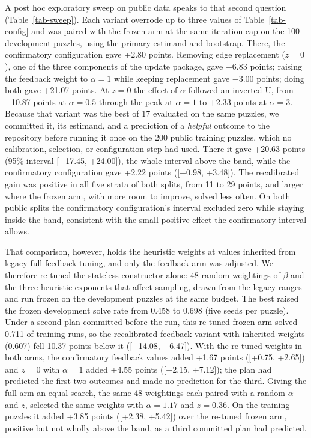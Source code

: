 \documentclass[pdflatex,sn-basic,iicol]{sn-jnl}
\begin{document}
A post hoc exploratory sweep on public data speaks to that second question (Table~\ref{tab-sweep}). Each variant overrode up to three values of Table~\ref{tab-config} and was paired with the frozen arm at the same iteration cap on the 100 development puzzles, using the primary estimand and bootstrap. There, the confirmatory configuration gave +2.80 points. Removing edge replacement ($z = 0$), one of the three components of the update package, gave +6.83 points; raising the feedback weight to $\alpha = 1$ while keeping replacement gave \(-\)3.00 points; doing both gave +21.07 points. At $z = 0$ the effect of $\alpha$ followed an inverted U, from +10.87 points at $\alpha = 0.5$ through the peak at $\alpha = 1$ to +2.33 points at $\alpha = 3$. Because that variant was the best of 17 evaluated on the same puzzles, we committed it, its estimand, and a prediction of a \emph{helpful} outcome to the repository before running it once on the 200 public training puzzles, which no calibration, selection, or configuration step had used. There it gave +20.63 points (95\% interval [+17.45, +24.00]), the whole interval above the band, while the confirmatory configuration gave +2.22 points ([+0.98, +3.48]). The recalibrated gain was positive in all five strata of both splits, from 11 to 29 points, and larger where the frozen arm, with more room to improve, solved less often. On both public splits the confirmatory configuration's interval excluded zero while staying inside the band, consistent with the small positive effect the confirmatory interval allows.

That comparison, however, holds the heuristic weights at values inherited from legacy full-feedback tuning, and only the feedback arm was adjusted. We therefore re-tuned the stateless constructor alone: 48 random weightings of $\beta$ and the three heuristic exponents that affect sampling, drawn from the legacy ranges and run frozen on the development puzzles at the same budget. The best raised the frozen development solve rate from 0.458 to 0.698 (five seeds per puzzle). Under a second plan committed before the run, this re-tuned frozen arm solved 0.711 of training runs, so the recalibrated feedback variant with inherited weights (0.607) fell 10.37 points below it ([\(-\)14.08, \(-\)6.47]). With the re-tuned weights in both arms, the confirmatory feedback values added +1.67 points ([+0.75, +2.65]) and $z = 0$ with $\alpha = 1$ added +4.55 points ([+2.15, +7.12]); the plan had predicted the first two outcomes and made no prediction for the third. Giving the full arm an equal search, the same 48 weightings each paired with a random $\alpha$ and $z$, selected the same weights with $\alpha = 1.17$ and $z = 0.36$. On the training puzzles it added +3.85 points ([+2.38, +5.42]) over the re-tuned frozen arm, positive but not wholly above the band, as a third committed plan had predicted.
\end{document}
